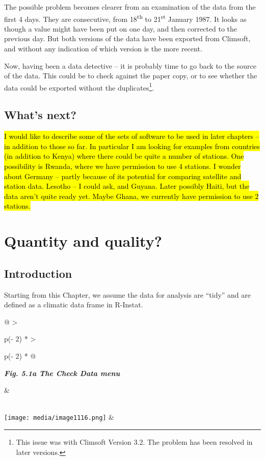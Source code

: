 \documentclass[
  letterpaper,
  DIV=11,
  numbers=noendperiod]{scrreprt}
\begin{document}
The possible problem becomes clearer from an examination of the data
from the first 4 days. They are consecutive, from 18\textsuperscript{th}
to 21\textsuperscript{st} January 1987. It looks as though a value might
have been put on one day, and then corrected to the previous day. But
both versions of the data have been exported from Climsoft, and without
any indication of which version is the more recent.

Now, having been a data detective -- it is probably time to go back to
the source of the data. This could be to check against the paper copy,
or to see whether the data could be exported without the
duplicates\footnote{This issue was with Climsoft Version 3.2. The
  problem has been resolved in later versions.}.

\section{What's next?}\label{whats-next}

\hl{I would like to describe some of the sets of software to be used in
later chapters -- in addition to those so far. In particular I am
looking for examples from countries (in addition to Kenya) where there
could be quite a number of stations. One possibility is Rwanda, where we
have permission to use 4 stations. I wonder about Germany -- partly
because of its potential for comparing satellite and station data.
Lesotho -- I could ask, and Guyana. Later possibly Haiti, but the data
aren't quite ready yet. Maybe Ghana, we currently have permission to use
2 stations.}


\chapter{Quantity and quality?}\label{quantity-and-quality}

\section{Introduction}\label{introduction-3}

Starting from this Chapter, we assume the data for analysis are ``tidy''
and are defined as a climatic data frame in R-Instat.

\begin{longtable}[]{@{}
  >{\raggedright\arraybackslash}p{(\columnwidth - 2\tabcolsep) * }
  >{\raggedright\arraybackslash}p{(\columnwidth - 2\tabcolsep) * }@{}}
\toprule\noalign{}
\begin{minipage}[b]{\linewidth}\raggedright
\textbf{\emph{Fig. 5.1a The Check Data menu}}
\end{minipage} & \begin{minipage}[b]{\linewidth}\raggedright
\end{minipage} \\
\midrule\noalign{}
\endhead
\bottomrule\noalign{}
\endlastfoot
\texttt{[image: media/image1116.png]}
& \\
\end{longtable}
\end{document}
